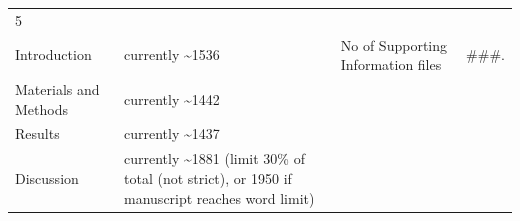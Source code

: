 \documentclass[]{article}
\begin{document}
\begin{longtable}[]{@{}llll@{}}
\begin{minipage}[t]{0.15\columnwidth}
5\strut
\end{minipage}\tabularnewline
\begin{minipage}[t]{0.35\columnwidth}\raggedright
Introduction\strut
\end{minipage} & \begin{minipage}[t]{0.16\columnwidth}\raggedright
currently \textasciitilde{}1536\strut
\end{minipage} & \begin{minipage}[t]{0.22\columnwidth}\raggedright
No of Supporting Information files\strut
\end{minipage} & \begin{minipage}[t]{0.15\columnwidth}\raggedright
\#\#\#.\strut
\end{minipage}\tabularnewline
\begin{minipage}[t]{0.35\columnwidth}\raggedright
Materials and Methods\strut
\end{minipage} & \begin{minipage}[t]{0.16\columnwidth}\raggedright
currently \textasciitilde{}1442\strut
\end{minipage} & \begin{minipage}[t]{0.22\columnwidth}\raggedright
\strut
\end{minipage} & \begin{minipage}[t]{0.15\columnwidth}\raggedright
\strut
\end{minipage}\tabularnewline
\begin{minipage}[t]{0.35\columnwidth}\raggedright
Results\strut
\end{minipage} & \begin{minipage}[t]{0.16\columnwidth}\raggedright
currently \textasciitilde{}1437\strut
\end{minipage} & \begin{minipage}[t]{0.22\columnwidth}\raggedright
\strut
\end{minipage} & \begin{minipage}[t]{0.15\columnwidth}\raggedright
\strut
\end{minipage}\tabularnewline
\begin{minipage}[t]{0.35\columnwidth}\raggedright
Discussion\strut
\end{minipage} & \begin{minipage}[t]{0.16\columnwidth}\raggedright
currently \textasciitilde{}1881 (limit 30\% of total (not strict), or
1950 if manuscript reaches word limit)\strut
\end{minipage} & \begin{minipage}[t]{0.22\columnwidth}\raggedright

\end{minipage}
\end{longtable}
\end{document}
